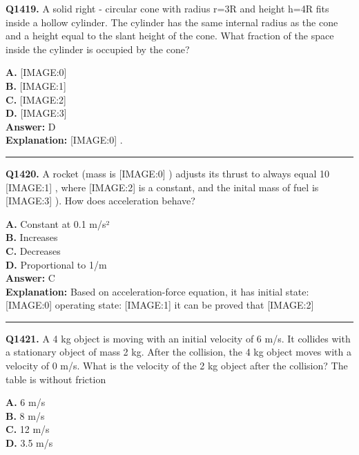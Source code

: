 \documentclass[12pt]{article}
\begin{document}
\noindent
\textbf{Q1419.} A solid right - circular cone with radius r=3R
and height h=4R
fits inside a hollow cylinder. The cylinder has the same internal radius as the cone and a height equal to the slant height of the cone. What fraction of the space inside the cylinder is occupied by the cone?



\textbf{A.} [IMAGE:0] \\
\textbf{B.} [IMAGE:1] \\
\textbf{C.} [IMAGE:2] \\
\textbf{D.} [IMAGE:3] \\

\textbf{Answer:} D \\
\textbf{Explanation:} [IMAGE:0]
.

\hrule
\vspace{1em}


\noindent
\textbf{Q1420.} A rocket (mass is
[IMAGE:0]
) adjusts its thrust to always equal 10%
[IMAGE:1]
, where
[IMAGE:2]
is a constant, and the inital mass of fuel is
[IMAGE:3]
).
How does acceleration behave?



\textbf{A.} Constant at 0.1 m/s² \\
\textbf{B.} Increases \\
\textbf{C.} Decreases \\
\textbf{D.} Proportional to 1/m \\

\textbf{Answer:} C \\
\textbf{Explanation:} Based on acceleration-force equation, it has
initial state:
[IMAGE:0]
operating state:
[IMAGE:1]
it can be proved that
[IMAGE:2]

\hrule
\vspace{1em}


\noindent
\textbf{Q1421.} A 4 kg object is moving with an initial velocity of 6 m/s. It collides with a stationary object of mass 2 kg. After the collision, the 4 kg object moves with a velocity of 0 m/s. What is the velocity of the 2 kg object after the collision? The table is without friction



\textbf{A.} 6 m/s \\
\textbf{B.} 8 m/s \\
\textbf{C.} 12 m/s \\
\textbf{D.} 3.5 m/s \\
\end{document}
